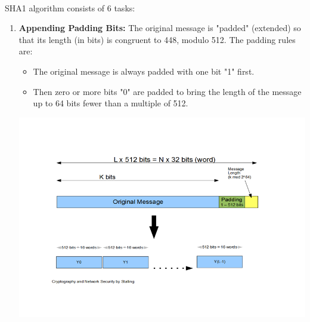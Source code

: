 \documentclass[a4paper,12pt]{article}
\begin{document}
	\paragraph{} SHA1 algorithm consists of 6 tasks:
	\begin{enumerate}
		\item  \textbf{Appending Padding Bits:} The original message is "padded" (extended) so that its length (in bits) is congruent to 448, modulo 512. The padding rules are: 
			\begin{itemize}
				\item The original message is always padded with one bit "1" first.
				\item Then zero or more bits "0" are padded to bring the length of the message up to 64 bits fewer than a multiple of 512.					
			\end{itemize}
		\includegraphics[width=\textwidth]{message_padding}		
			

\end{enumerate}
\end{document}
